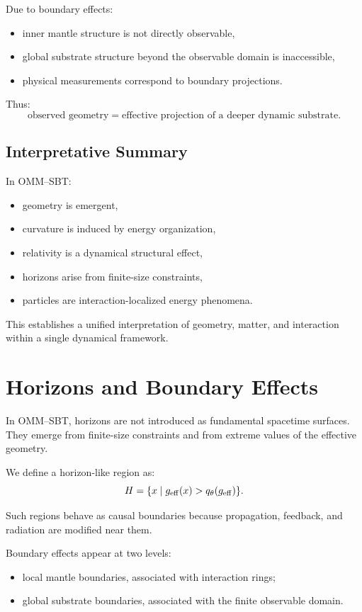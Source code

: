 \documentclass[11pt]{article}
\begin{document}
Due to boundary effects:
\begin{itemize}
\item inner mantle structure is not directly observable,
\item global substrate structure beyond the observable domain is inaccessible,
\item physical measurements correspond to boundary projections.
\end{itemize}

Thus:
\begin{equation}
\text{observed geometry} = \text{effective projection of a deeper dynamic substrate}.
\end{equation}

\subsection{Interpretative Summary}

In OMM--SBT:
\begin{itemize}
\item geometry is emergent,
\item curvature is induced by energy organization,
\item relativity is a dynamical structural effect,
\item horizons arise from finite-size constraints,
\item particles are interaction-localized energy phenomena.
\end{itemize}

This establishes a unified interpretation of geometry, matter, and interaction within a single dynamical framework.

\section{Horizons and Boundary Effects}

In OMM--SBT, horizons are not introduced as fundamental spacetime surfaces. They emerge from finite-size constraints and from extreme values of the effective geometry.

We define a horizon-like region as:
\[
H = \{x \mid g_{\rm eff}(x) > q_\theta(g_{\rm eff})\}.
\]

Such regions behave as causal boundaries because propagation, feedback, and radiation are modified near them.

Boundary effects appear at two levels:
\begin{itemize}
\item local mantle boundaries, associated with interaction rings;
\item global substrate boundaries, associated with the finite observable domain.
\end{itemize}
\end{document}
